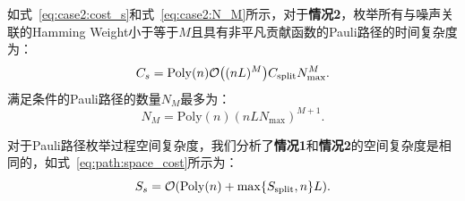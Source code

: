 如式~\eqref{eq:case2:cost_s}和式~\eqref{eq:case2:N_M}所示，对于\textbf{情况2}，枚举所有与噪声关联的Hamming Weight小于等于$M$且具有非平凡贡献函数的Pauli路径的时间复杂度为：
\begin{equation*}
    C_s=\mathrm{Poly}(n) \order{(nL)^{M}} C_{\text{split}} N_{\text{max}}^{M}.
\end{equation*}
满足条件的Pauli路径的数量$N_M$最多为：
\begin{equation*}
    N_M=\mathrm{Poly}(n) (nLN_{\text{max}})^{M+1}.
\end{equation*}


对于Pauli路径枚举过程空间复杂度，我们分析了\textbf{情况1}和\textbf{情况2}的空间复杂度是相同的，如式~\eqref{eq:path:space_cost}所示为：
\begin{equation*}
S_s=\order{\mathrm{Poly}(n)+\max\{S_{\text{split}},n\}L}.
\end{equation*}

